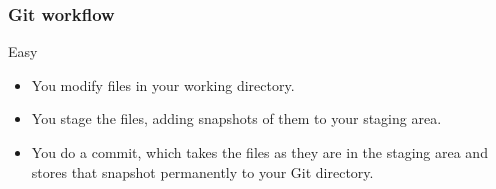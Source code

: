 \begin{frame}

  \frametitle{Git workflow}

  Easy

  \vspace{2em}

  \begin{itemize}
    \item You modify files in your working directory.

    \item You stage the files, adding snapshots of them to your staging area.

    \item You do a commit, which takes the files as they are in the staging
      area and stores that snapshot permanently to your Git directory.
  \end{itemize}

\end{frame}

